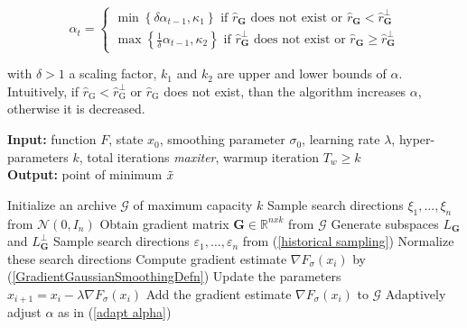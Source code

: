 \begin{equation}\label{adapt alpha}
	\alpha_{t}=\left\{\begin{array}{ll}\min \left\{\delta \alpha_{t-1}, \kappa_{1}\right\} \text { if } \widehat{r}_{\mathbf{G}} \text { does not exist or } \widehat{r}_{\mathbf{G}}<\widehat{r}_{\mathbf{G}}^{\perp} \\ \max \left\{\frac{1}{\delta} \alpha_{t-1}, \kappa_{2}\right\} \text { if } \widehat{r}_{\mathbf{G}}^{\perp} \text { does not exist or } \widehat{r}_{\mathbf{G}} \geq \widehat{r}_{\mathbf{G}}^{\perp}\end{array}\right. 
\end{equation}

with $\delta > 1$ a scaling factor, $k_1$ and $k_2$ are upper and lower bounds of $\alpha$. Intuitively, if $\widehat{r}_{\mathrm{G}}<\widehat{r}_{\mathrm{G}}^{\perp} $ or $\widehat{r}_{\mathrm{G}}$ does not exist, than the algorithm increases $\alpha$, otherwise it is decreased.

\begin{algorithm}[h]
\caption{SGES algorithm}\label{SGES}

\hspace*{\algorithmicindent} \textbf{Input:} function $F$, state $x_0$, smoothing parameter $\sigma_0$, learning rate $\lambda$, hyper-parameters $k$, total iterations \textit{maxiter}, warmup iteration $T_w \geq k$\\
\hspace*{\algorithmicindent} \textbf{Output:} point of minimum $\Tilde{x}$
\begin{algorithmic}[1]

\State Initialize an archive $\mathcal{G}$ of maximum capacity $k$
        \State Sample search directions $\xi_1,\dots,\xi_n$ from $\mathcal{N}(0,I_n)$
    \Else
        \State Obtain gradient matrix $\mathbf{G}\in\mathbb{R}^{nxk}$ from $\mathcal{G}$
        \State Generate subspaces $L_{\mathbf{G}}$ and $L_{\mathbf{G}}^{\perp}$
        \State Sample search directions $\varepsilon_1,\dots,\varepsilon_n$ from (\ref{historical sampling})
        \State Normalize these search directions
    \EndIf
    \State Compute gradient estimate $ \nabla F_{\sigma}\left(x_{i} \right) $ by (\ref{GradientGaussianSmoothingDefn})
    \State Update the parameters $ x_{i+1}=x_{i}-\lambda \nabla F_{\sigma}\left(x_{i}\right) $
    \State Add the gradient estimate $ \nabla F_{\sigma}\left(x_{i} \right) $ to $\mathcal{G}$
        \State Adaptively adjust $\alpha$ as in (\ref{adapt alpha})
    \EndIf
\EndFor

\end{algorithmic}
\end{algorithm}

